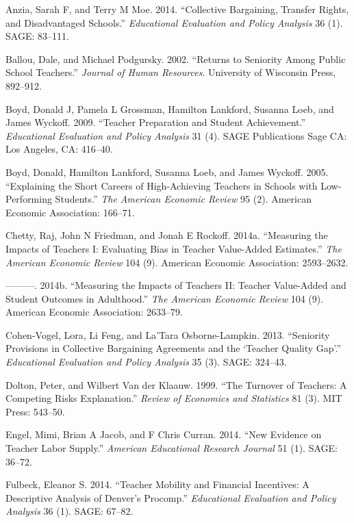 \documentclass[12pt,]{article}
\begin{document}
\hypertarget{refs}{}
\hypertarget{ref-anzia}{}
Anzia, Sarah F, and Terry M Moe. 2014. ``Collective Bargaining, Transfer
Rights, and Disadvantaged Schools.'' \emph{Educational Evaluation and
Policy Analysis} 36 (1). SAGE: 83--111.

\hypertarget{ref-ballou}{}
Ballou, Dale, and Michael Podgursky. 2002. ``Returns to Seniority Among
Public School Teachers.'' \emph{Journal of Human Resources}. University
of Wisconsin Press, 892--912.

\hypertarget{ref-boyd2009}{}
Boyd, Donald J, Pamela L Grossman, Hamilton Lankford, Susanna Loeb, and
James Wyckoff. 2009. ``Teacher Preparation and Student Achievement.''
\emph{Educational Evaluation and Policy Analysis} 31 (4). SAGE
Publications Sage CA: Los Angeles, CA: 416--40.

\hypertarget{ref-boyd2005}{}
Boyd, Donald, Hamilton Lankford, Susanna Loeb, and James Wyckoff. 2005.
``Explaining the Short Careers of High-Achieving Teachers in Schools
with Low-Performing Students.'' \emph{The American Economic Review} 95
(2). American Economic Association: 166--71.

\hypertarget{ref-chettyI}{}
Chetty, Raj, John N Friedman, and Jonah E Rockoff. 2014a. ``Measuring
the Impacts of Teachers I: Evaluating Bias in Teacher Value-Added
Estimates.'' \emph{The American Economic Review} 104 (9). American
Economic Association: 2593--2632.

\hypertarget{ref-chettyII}{}
---------. 2014b. ``Measuring the Impacts of Teachers II: Teacher
Value-Added and Student Outcomes in Adulthood.'' \emph{The American
Economic Review} 104 (9). American Economic Association: 2633--79.

\hypertarget{ref-cohenvogel}{}
Cohen-Vogel, Lora, Li Feng, and La'Tara Osborne-Lampkin. 2013.
``Seniority Provisions in Collective Bargaining Agreements and the
`Teacher Quality Gap'.'' \emph{Educational Evaluation and Policy
Analysis} 35 (3). SAGE: 324--43.

\hypertarget{ref-dolton}{}
Dolton, Peter, and Wilbert Van der Klaauw. 1999. ``The Turnover of
Teachers: A Competing Risks Explanation.'' \emph{Review of Economics and
Statistics} 81 (3). MIT Press: 543--50.

\hypertarget{ref-engel}{}
Engel, Mimi, Brian A Jacob, and F Chris Curran. 2014. ``New Evidence on
Teacher Labor Supply.'' \emph{American Educational Research Journal} 51
(1). SAGE: 36--72.

\hypertarget{ref-fulbeck}{}
Fulbeck, Eleanor S. 2014. ``Teacher Mobility and Financial Incentives: A
Descriptive Analysis of Denver's Procomp.'' \emph{Educational Evaluation
and Policy Analysis} 36 (1). SAGE: 67--82.
\end{document}
